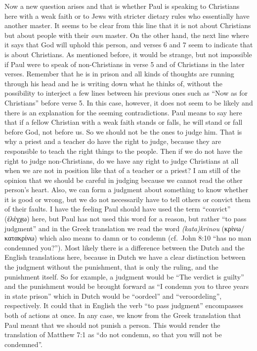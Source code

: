 Now a new question arises and that is whether Paul is speaking to
Christians here with a weak faith or to Jews with stricter dietary rules
who essentially have another master. It seems to be clear from this line
that it is not about Christians but about people with their \emph{own}
master. On the other hand, the next line where it says that God will
uphold this person, and verses 6 and 7 seem to indicate that is about
Christians. As mentioned before, it would be strange, but not impossible
if Paul were to speak of non-Christians in verse 5 and of Christians in
the later verses. Remember that he is in prison and all kinds of
thoughts are running through his head and he is writing down what he
thinks of, without the possibility to interject a few lines between his
previous ones such as ``Now as for Christians'' before verse 5. In this
case, however, it does not seem to be likely and there is an explanation
for the seeming contradictions. Paul means to say here that if a fellow
Christian with a weak faith stands or falls, he will stand or fall
before God, not before us. So we should not be the ones to judge him.
That is why a priest and a teacher do have the right to judge, because
they are responsible to teach the right things to the people. Then if we
do not have the right to judge non-Christians, do we have any right to
judge Christians at all when we are not in position like that of a
teacher or a priest? I am still of the opinion that we should be careful
in judging because we cannot read the other person's heart. Also, we can
form a judgment about something to know whether it is good or wrong, but
we do not necessarily have to tell others or convict them of their
faults. I have the feeling Paul should have used the term ``convict''
(ἐλέγχω) here, but Paul has not used this word for a reason, but rather
``to pass judgment'' and in the Greek translation we read the word
\emph{(kata)krinou} (κρίνω/κατακρίνω) which also means to damn or to
condemn (cf.~John 8:10 ``has no man condemned you?''). Most likely there
is a difference between the Dutch and the English translations here,
because in Dutch we have a clear distinction between the judgment
without the punishment, that is only the ruling, and the punishment
itself. So for example, a judgment would be ``The verdict is guilty''
and the punishment would be brought forward as ``I condemn you to three
years in state prison'' which in Dutch would be ``oordeel'' and
``veroordeling'', respectively. It could that in English the verb ``to
pass judgment'' encompasses both of actions at once. In any case, we
know from the Greek translation that Paul meant that we should not
punish a person. This would render the translation of Matthew 7:1 as
``do not condemn, so that you will not be condemned''.


